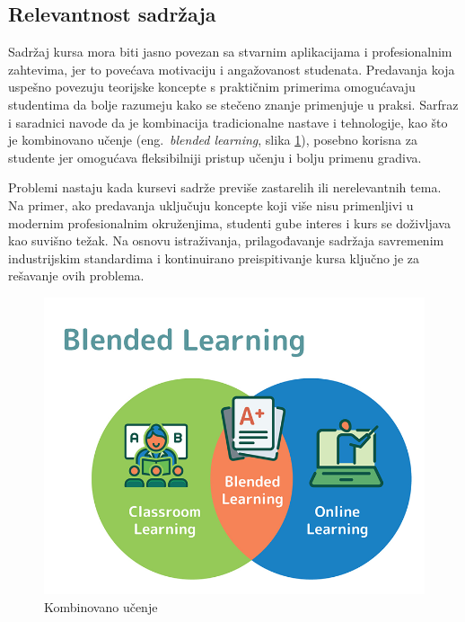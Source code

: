 \documentclass[a4paper]{article}
\begin{document}
\subsection{Relevantnost sadržaja}
Sadržaj kursa mora biti jasno povezan sa stvarnim aplikacijama i profesionalnim zahtevima,
jer to povećava motivaciju i angažovanost studenata. Predavanja koja uspešno povezuju
teorijske koncepte s praktičnim primerima omogućavaju studentima da bolje razumeju kako
se stečeno znanje primenjuje u praksi. Sarfraz i saradnici \cite{sarfraz2022viability} navode da je kombinacija
tradicionalne nastave i tehnologije, kao što je kombinovano učenje (eng.~{\em blended learning}, slika \ref{fig:kombinovano_ucenje}), posebno korisna za studente
jer omogućava fleksibilniji pristup učenju i bolju primenu gradiva.

Problemi nastaju kada kursevi sadrže previše zastarelih ili nerelevantnih tema. Na primer,
ako predavanja uključuju koncepte koji više nisu primenljivi u modernim profesionalnim
okruženjima, studenti gube interes i kurs se doživljava kao suvišno težak. Na osnovu
istraživanja, prilagođavanje sadržaja savremenim industrijskim standardima i kontinuirano
preispitivanje kursa ključno je za rešavanje ovih problema.

\begin{figure}[h!]
\begin{center}
\includegraphics[scale=0.4]{blended_learning.png}
\end{center}
\caption{Kombinovano učenje}
\label{fig:kombinovano_ucenje}
\end{figure}
\end{document}
